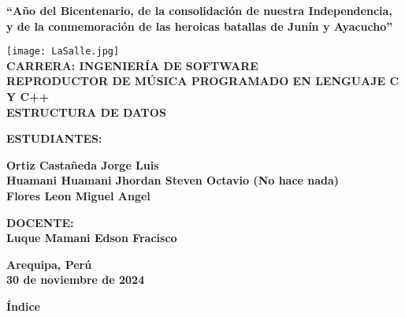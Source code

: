 \documentclass[12pt]{article}
\begin{document}
    
    
    \begin{center}
        \fontsize{12}{14}\selectfont %
        \textbf{“Año del Bicentenario, de la consolidación de nuestra Independencia, \\
        y de la conmemoración de las heroicas batallas de Junín y Ayacucho”}
        
        \texttt{[image: LaSalle.jpg]}\\
    
        
        \textbf{CARRERA: INGENIERÍA DE SOFTWARE} \\
        \textbf{REPRODUCTOR DE MÚSICA PROGRAMADO EN LENGUAJE C Y C++} \\
        \textbf{ESTRUCTURA DE DATOS} \\
        
        \vspace{1cm}
        
        \textbf{ESTUDIANTES:} \\
        
        \vspace{1cm}
        
        \textbf{Ortiz Castañeda Jorge Luis} \\
        \textbf{Huamani Huamani Jhordan Steven Octavio (No hace nada)} \\
        \textbf{Flores Leon Miguel Angel} \\

        \vspace{1cm}
        
        \textbf{DOCENTE:} \\
        \textbf{Luque Mamani Edson Fracisco} \\

        \vspace{1cm}
        
        \textbf{Arequipa, Perú} \\
        \textbf{30 de noviembre de 2024}
    \end{center}
    
    \newpage
    
    \renewcommand{\contentsname}{}
    
    \begin{center}
        \textbf{\huge Índice} %
    \end{center}
    
\end{document}
